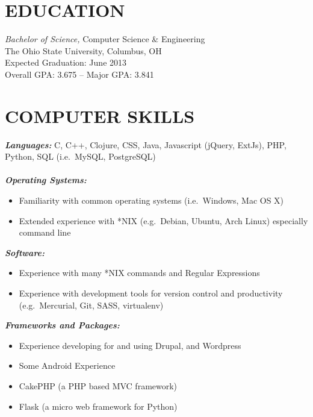 \documentclass[line,margin=.2,letterpaper]{resume}
\begin{document}
\fancyhead{}
\fancyfoot{}
\renewcommand{\headrulewidth}{0pt}
\address{2092 Middlesex road, Columbus, OH 43220}
\address{\href{mailto:ryan@ryanmcg.com}{ryan@ryanmcg.com} -- (614) 678-4408 --
\href{https://github.com/RyanMcG}{RyanMcG on GitHub}}
\begin{resume}
\vspace{-.45in}
 
\section{\uppercase{Education}} {\sl Bachelor of Science,} \/Computer Science \&
Engineering \\
		The Ohio State University, Columbus, OH \\
        Expected Graduation: June 2013 \\
		Overall GPA: 3.675 -- Major GPA: 3.841 \\
\vspace{-.15in}
 
\section{\uppercase{Computer Skills}}
	{\sl\textbf{Languages:}}
        \/C, C++, Clojure, CSS, Java, Javascript (jQuery, ExtJs), PHP, Python,
        SQL (i.e.~MySQL, PostgreSQL) \\ \\
	{\sl\textbf{Operating Systems: }} \hfill 
	    \begin{itemize}
		\item Familiarity with common operating systems (i.e.~Windows, Mac OS X)
        \item Extended experience with *NIX (e.g.~Debian, Ubuntu, Arch Linux)
              especially command line
        \end{itemize}
	{\sl\textbf{Software:}} \hfill 
	    \begin{itemize}
		\item Experience with many *NIX commands and Regular Expressions
		\item Experience with development tools for version control and
              productivity (e.g.~Mercurial, Git, SASS, virtualenv)
	    \end{itemize}
	{\sl\textbf{Frameworks and Packages:}} \hfill 
	    \begin{itemize}
		\item Experience developing for and using Drupal, and Wordpress
		\item Some Android Experience
        \item CakePHP (a PHP based MVC framework)
        \item Flask (a micro web framework for Python)
	    \end{itemize}



\end{resume}
\end{document}
